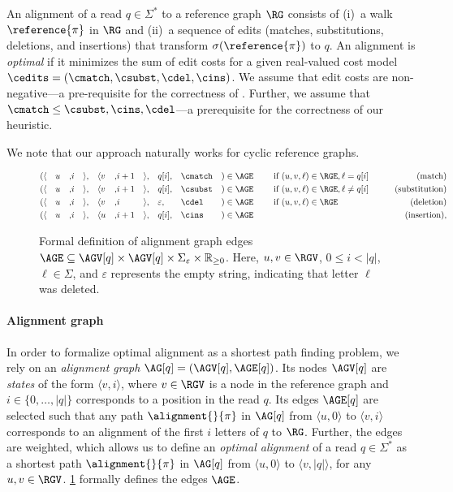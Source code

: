 An alignment of a read $q \in \Sigma^*$ to a reference graph $\RG$ consists of
(i)~a walk $\reference{\pi}$ in $\RG$ and (ii)~a sequence of edits (matches,
substitutions, deletions, and insertions) that transform
$\sigma(\reference{\pi})$ to $q$. An alignment is \emph{optimal} if it minimizes
the sum of edit costs for a given real-valued cost model $\cedits = (\cmatch,
\csubst,\cdel, \cins)$.
%
We assume that edit costs are non-negative---a pre-requisite for the correctness
of \A. Further, we assume that $\cmatch \leq \csubst, \cins, \cdel$---a
prerequisite for the correctness of our heuristic.

We note that our approach naturally works for cyclic reference graphs.

\begin{figure}[t]
	\begin{alignat*}{20}
		(
			&\langle&& u &,& i   &\rangle&,
			&\langle&  v &,& i+1 &\rangle&,
			&&q[i],
			&&\cmatch
		&)&\in \AGE
		&& \quad \text{ if } (u,v,\ell) \in \RGE, \ell = q[i] & \qquad \text{(match)}\\
		(
			&\langle&& u &,& i   &\rangle&,
			&\langle&  v &,& i+1 &\rangle&,
			&&q[i],
			&&\csubst
		&) &\in \AGE
		&& \quad \text{ if } (u,v,\ell) \in \RGE, \ell \neq q[i] & \qquad \text{(substitution)}\\
		(
			&\langle&& u &,& i &\rangle&,
			&\langle&  v &,& i &\rangle&,
			&&\varepsilon,
			&&\cdel
		&) &\in \AGE
		&& \quad \text{ if } (u,v,\ell) \in \RGE & \qquad \text{(deletion)}\\
		(
			&\langle&& u &,& i   &\rangle&,
			&\langle&  u &,& i+1 &\rangle&,
			&&q[i],
			&&\cins
		&) &\in \AGE
		&& \quad & \qquad \text{(insertion)},
	\end{alignat*}
	\caption[Formal definition of alignment graph]{Formal definition of
	alignment graph edges $\AGE \subseteq \AGV[q] \times \AGV[q] \times
	\Sigma_\varepsilon \times \mathbb{R}_{\geq 0}$. Here, $u,v \in \RGV$, $0
	\leq i < |q|$, $\ell \in \Sigma$, and $\varepsilon$ represents the empty
	string, indicating that letter $\ell$ was deleted.}
	\label{SEEDfig:graph-edges}
\end{figure}

\paragraph{Alignment graph}
%
In order to formalize optimal alignment as a shortest path finding problem, we
rely on an \emph{alignment graph} $\AG[q]=(\AGV[q],\AGE[q])$.
%
Its nodes $\AGV[q]$ are \emph{states} of the form $\langle v, i \rangle$, where
$v \in \RGV$ is a node in the reference graph and $i \in \{0, \dots, |q|\}$
corresponds to a position in the read $q$.
%
Its edges $\AGE[q]$ are selected such that any path $\alignment{}{\pi}$ in
$\AG[q]$ from $\langle u, 0 \rangle$ to $\langle v, i \rangle$ corresponds to an
alignment of the first $i$ letters of $q$ to $\RG$.
%
Further, the edges are weighted, which allows us to define an \emph{optimal
alignment} of a read $q \in \Sigma^*$ as a shortest path $\alignment{}{\pi}$ in
$\AG[q]$ from $\langle u, 0 \rangle$ to $\langle v, |q| \rangle$, for any $u, v
\in \RGV$.
%
\cref{SEEDfig:graph-edges} formally defines the edges $\AGE$.

